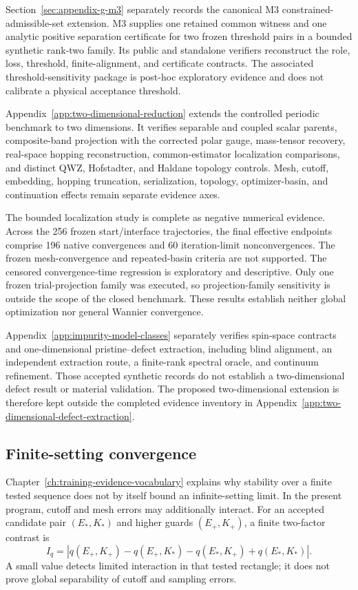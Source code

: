 Section~\ref{sec:appendix-g-m3} separately records the canonical M3
constrained-admissible-set extension. M3 supplies one retained common witness and one analytic positive
separation certificate for two frozen threshold pairs in a bounded synthetic
rank-two family. Its public and standalone verifiers reconstruct the role,
loss, threshold, finite-alignment, and certificate contracts. The associated
threshold-sensitivity package is post-hoc exploratory evidence and does not
calibrate a physical acceptance threshold.

Appendix~\ref{app:two-dimensional-reduction} extends the controlled
periodic benchmark to two dimensions. It verifies separable and coupled scalar
parents, composite-band projection with the corrected polar gauge, mass-tensor
recovery, real-space hopping reconstruction, common-estimator localization
comparisons, and distinct QWZ, Hofstadter, and Haldane topology controls.
Mesh, cutoff, embedding, hopping truncation, serialization, topology,
optimizer-basin, and continuation effects remain separate evidence axes.

The bounded localization study is complete as negative numerical evidence.
Across the 256 frozen start/interface trajectories, the final effective
endpoints comprise 196 native convergences and 60 iteration-limit
nonconvergences. The frozen mesh-convergence and repeated-basin criteria are
not supported. The censored convergence-time regression is exploratory and
descriptive. Only one frozen trial-projection family was executed, so
projection-family sensitivity is outside the scope of the closed benchmark.
These results establish neither global optimization nor general Wannier
convergence.

Appendix~\ref{app:impurity-model-classes} separately verifies spin-space
contracts and one-dimensional pristine--defect extraction, including blind
alignment, an independent extraction route, a finite-rank spectral oracle, and
continuum refinement. Those accepted synthetic records do not establish a
two-dimensional defect result or material validation. The proposed
two-dimensional extension is therefore kept outside the completed evidence
inventory in Appendix~\ref{app:two-dimensional-defect-extraction}.

\subsection{Finite-setting convergence}

Chapter~\ref{ch:training-evidence-vocabulary} explains why stability over a
finite tested sequence does not by itself bound an infinite-setting limit. In
the present program, cutoff and mesh errors may additionally interact. For an
accepted candidate pair
$(E_{\ast},K_{\ast})$ and higher guards $(E_{+},K_{+})$, a finite two-factor
contrast is
\begin{equation}
  I_q=
  \left|
    q(E_{+},K_{+})-q(E_{+},K_{\ast})
    -q(E_{\ast},K_{+})+q(E_{\ast},K_{\ast})
  \right|.
\end{equation}
A small value detects limited interaction in that tested rectangle; it does not
prove global separability of cutoff and sampling errors.

